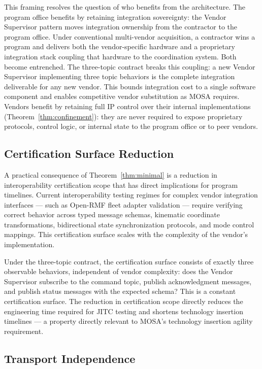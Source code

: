 \documentclass[a4paper,fleqn]{cas-dc}
\begin{document}
This framing resolves the question of who benefits from the architecture. The program office benefits by retaining integration sovereignty: the Vendor Supervisor pattern moves integration ownership from the contractor to the program office. Under conventional multi-vendor acquisition, a contractor wins a program and delivers both the vendor-specific hardware and a proprietary integration stack coupling that hardware to the coordination system. Both become entrenched. The three-topic contract breaks this coupling: a new Vendor Supervisor implementing three topic behaviors is the complete integration deliverable for any new vendor. This bounds integration cost to a single software component and enables competitive vendor substitution as MOSA requires. Vendors benefit by retaining full IP control over their internal implementations (Theorem~\ref{thm:confinement}): they are never required to expose proprietary protocols, control logic, or internal state to the program office or to peer vendors.

\subsection{Certification Surface Reduction}

A practical consequence of Theorem~\ref{thm:minimal} is a reduction in interoperability certification scope that has direct implications for program timelines. Current interoperability testing regimes for complex vendor integration interfaces --- such as Open-RMF fleet adapter validation --- require verifying correct behavior across typed message schemas, kinematic coordinate transformations, bidirectional state synchronization protocols, and mode control mappings. This certification surface scales with the complexity of the vendor's implementation.

Under the three-topic contract, the certification surface consists of exactly three observable behaviors, independent of vendor complexity: does the Vendor Supervisor subscribe to the command topic, publish acknowledgment messages, and publish status messages with the expected schema? This is a constant certification surface. The reduction in certification scope directly reduces the engineering time required for JITC testing and shortens technology insertion timelines --- a property directly relevant to MOSA's technology insertion agility requirement.

\subsection{Transport Independence}
\end{document}
